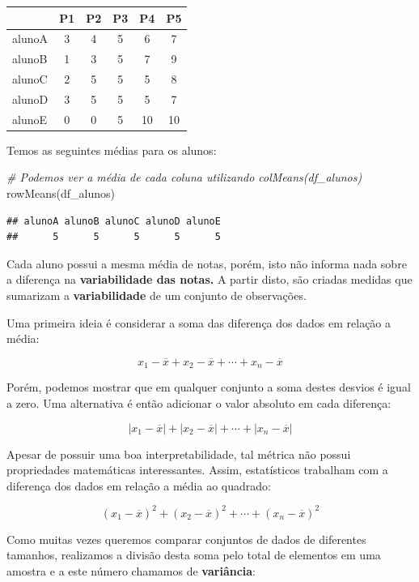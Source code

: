 \documentclass[
]{book}
\newenvironment{Shaded}{\begin{snugshade}}{\end{snugshade}}
\newcommand{\CommentTok}[1]{\textcolor[rgb]{0.56,0.35,0.01}{\textit{#1}}}
\newcommand{\FunctionTok}[1]{\textcolor[rgb]{0.00,0.00,0.00}{#1}}
\newcommand{\NormalTok}[1]{#1}
\begin{document}
\begin{tabular}{l|c|c|c|c|c}
\hline
  & P1 & P2 & P3 & P4 & P5\\
\hline
alunoA & 3 & 4 & 5 & 6 & 7\\
\hline
alunoB & 1 & 3 & 5 & 7 & 9\\
\hline
alunoC & 2 & 5 & 5 & 5 & 8\\
\hline
alunoD & 3 & 5 & 5 & 5 & 7\\
\hline
alunoE & 0 & 0 & 5 & 10 & 10\\
\hline
\end{tabular}

Temos as seguintes médias para os alunos:

\begin{Shaded}
\begin{Highlighting}[]
\CommentTok{\# Podemos ver a média de cada coluna utilizando colMeans(df\_alunos)}
\FunctionTok{rowMeans}\NormalTok{(df\_alunos)}
\end{Highlighting}
\end{Shaded}

\begin{verbatim}
## alunoA alunoB alunoC alunoD alunoE 
##      5      5      5      5      5
\end{verbatim}

Cada aluno possui a mesma média de notas, porém, isto não informa nada sobre a diferença na \textbf{variabilidade das notas.} A partir disto, são criadas medidas que sumarizam a \textbf{variabilidade} de um conjunto de observações.

Uma primeira ideia é considerar a soma das diferença dos dados em relação a média:

\[
x_1 - \overline{x} + x_2 - \overline{x} + \cdots + x_n - \overline{x}
\]

Porém, podemos mostrar que em qualquer conjunto a soma destes desvios é igual a zero. Uma alternativa é então adicionar o valor absoluto em cada diferença:

\[
|x_1 - \overline{x}| + |x_2 - \overline{x}| + \cdots + |x_n - \overline{x}|
\]

Apesar de possuir uma boa interpretabilidade, tal métrica não possui propriedades matemáticas interessantes. Assim, estatísticos trabalham com a diferença dos dados em relação a média ao quadrado:

\[
(x_1 - \overline{x})^2 + (x_2 - \overline{x})^2 + \cdots + (x_n - \overline{x})^2
\]

Como muitas vezes queremos comparar conjuntos de dados de diferentes tamanhos, realizamos a divisão desta soma pelo total de elementos em uma amostra e a este número chamamos de \textbf{variância}:
\end{document}
